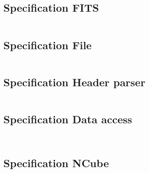 \documentclass[a4paper,10pt]{article}
\begin{document}
\subsection{Specification FITS}
\inputminted{ada}{../lib/src/fits.ads}

\subsection{Specification File}
\inputminted{ada}{../lib/src/file.ads}

\subsection{Specification Header parser}
\inputminted{ada}{../lib/src/parser/strict.ads}

\subsection{Specification Data access}
\inputminted{ada}{../lib/src/data/generic_data_value.ads}
\inputminted{ada}{../lib/src/data/generic_data_unit.ads}

\subsection{Specification NCube}
\inputminted{ada}{../lib/src/ncube/ncube_funcs.ads}






\end{document}
